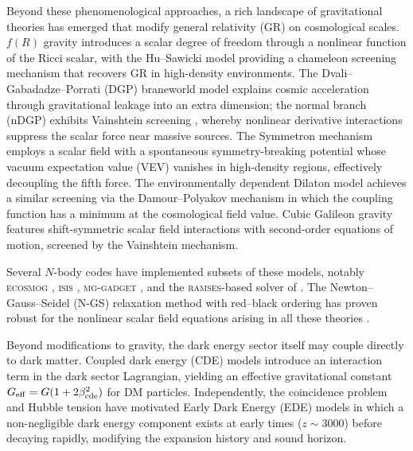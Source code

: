 \documentclass[fleqn,usenatbib]{mnras}
\newcommand{\ramses}{\textsc{ramses}}
\newcommand{\fR}{f(R)}
\newcommand{\Geff}{G_{\rm eff}}
\newcommand{\betacde}{\beta_{\rm cde}}
\begin{document}
Beyond these phenomenological approaches, a rich landscape of
gravitational theories has emerged that modify general relativity (GR)
on cosmological scales.  $\fR$ gravity
\citep{HuSawicki2007,Sotiriou2010} introduces a scalar degree of
freedom through a nonlinear function of the Ricci scalar, with the
Hu--Sawicki model providing a chameleon screening mechanism that
recovers GR in high-density environments.  The Dvali--Gabadadze--Porrati
(DGP) braneworld model \citep{DGP2000} explains cosmic acceleration
through gravitational leakage into an extra dimension; the normal
branch (nDGP) exhibits Vainshtein screening
\citep{Vainshtein1972,Nicolis2009}, whereby nonlinear derivative
interactions suppress the scalar force near massive sources.  The
Symmetron mechanism \citep{Hinterbichler2010,Hinterbichler2011}
employs a scalar field with a spontaneous symmetry-breaking potential
whose vacuum expectation value (VEV) vanishes in high-density regions,
effectively decoupling the fifth force.  The environmentally dependent
Dilaton model \citep{Brax2010,Brax2011} achieves a similar screening
via the Damour--Polyakov mechanism in which the coupling function has
a minimum at the cosmological field value.  Cubic Galileon gravity
\citep{Nicolis2009,Deffayet2009a,Deffayet2009b} features
shift-symmetric scalar field interactions with second-order equations
of motion, screened by the Vainshtein mechanism.

Several $N$-body codes have implemented subsets of these models,
notably \textsc{ecosmog} \citep{Li2012,Li2013}, \textsc{isis}
\citep{Llinares2014}, \textsc{mg-gadget} \citep{Puchwein2013}, and
the \ramses-based solver of \citet{Llinares2014}.  The
Newton--Gauss--Seidel (N-GS) relaxation method with red--black
ordering has proven robust for the nonlinear scalar field equations
arising in all these theories \citep{Li2012,Llinares2014}.

Beyond modifications to gravity, the dark energy sector itself may
couple directly to dark matter.  Coupled dark energy (CDE) models
\citep{Amendola2000,Amendola2004,Pettorino2008} introduce an
interaction term in the dark sector Lagrangian, yielding an effective
gravitational constant $\Geff = G(1+2\betacde^2)$ for DM particles.
Independently, the coincidence problem and Hubble tension have
motivated Early Dark Energy (EDE) models
\citep{DoranRobbers2006,Poulin2019,Hill2020,Smith2020} in which a
non-negligible dark energy component exists at early times
($z \sim 3000$) before decaying rapidly, modifying the expansion
history and sound horizon.
\end{document}
